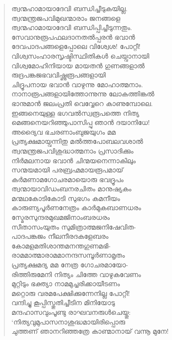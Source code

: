 \begin{verse}
ത്വന്മഹാമായാദേവി ബന്ധിച്ചീടുകയില്ല.\\
ത്വന്മന്ത്രജപവിമുഖന്മാരാം ജനങ്ങളെ\\
ത്വന്മഹാമായാദേവി ബന്ധിപ്പിച്ചീടുന്നതും.\\
സേവാനുരൂപഫലദാനതല്‍പ്പരന്‍ ഭവാന്‍\\
ദേവപാദപങ്ങളെപ്പോലെ വിശ്വേശ! പോറ്റീ!\\
വിശ്വസംഹാരസൃഷ്ടിസ്ഥിതികള്‍ ചെയ്വാനായി\\
വിശ്വമോഹിനിയായ മായതന്‍ ഗുണങ്ങളാല്‍\\
രുദ്രപങ്കജഭവവിഷ്ണുരൂപങ്ങളായി\\
ചിദ്രൂപനായ ഭവാന്‍ വാഴുന്നു മോഹാത്മനാം.\\
നാനാരൂപങ്ങളായിത്തോന്നുന്നു ലോകത്തിങ്കല്‍\\
ഭാനുമാന്‍ ജലംപ്രതി വെവ്വേറെ കാണുമ്പോലെ.\\
ഇങ്ങനെയുള്ള ഭഗവല്‍സ്വരൂപത്തെ നിത്യ\\
മെങ്ങനെയറിഞ്ഞുപാസിപ്പു ഞാന്‍ ദയാനിധേ!\\
അദ്യൈവ ഭചരണാംബുജയുഗം മമ\\
പ്രത്യക്ഷമായ്വന്നിതു മല്‍ത്തപോബലവശാല്‍\\
ത്വന്മന്ത്രജപവിശുദ്ധാത്മനാം പ്രസാദിക്കും\\
നിര്‍മലനായ ഭവാന്‍ ചിന്മയനെന്നാകിലും\\
സന്മയമായി പരബ്രഹ്മമായരൂപമായ്\\
കര്‍മണാമഗോചരമായൊരു ഭവദ്രൂപം\\
ത്വന്മായാവിഡംബനരചിതം മാനുഷ്യകം\\
മന്മഥകോടികോടി സുഭഗം കമനീയം\\
കാരുണ്യപൂര്‍ണനേത്രം കാര്‍മുകബാണധരം\\
സ്മേരസുന്ദരമുഖമജിനാംബരധരം\\
സീതാസംയുതം സുമിത്രാത്മജനിഷേവിത-\\
പാദപങ്കജം നീലനീരദകളേബരം\\
കോമളമതിശാന്തമനന്തഗുണമഭി-\\
രാമമാത്മാരാമമാനന്ദസമ്പൂര്‍ണാമൃതം\\
പ്രത്യക്ഷമദ്യ മമ നേത്ര ഗോചരമായോ-\\
രിത്തിരുമേനി നിത്യം ചിത്തേ വാഴുകവേണം\\
മുറ്റിടും ഭക്ത്യാ നാമമുച്ചരിക്കായീടണം\\
മറ്റൊരു വരമപേക്ഷിക്കുന്നേനില്ല പോറ്റീ!\\
വന്ദിച്ചു കൂപ്പിസ്തുതിച്ചീടിന മിനിയോടു\\
മന്ദഹാസവുംപൂണ്ടു രാഘവനരുള്‍ചെയ്തു:\\
‘നിത്യവുമുപാസനാശുദ്ധമായിരിപ്പൊരു\\
ചുത്തണ് ഞാനറിഞ്ഞത്രേ കാണ്മാനായ് വന്നൂ മുനേ!\\

\end{verse}
